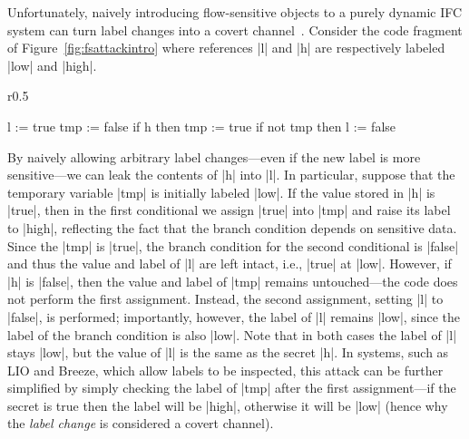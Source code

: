 Unfortunately, naively introducing flow-sensitive objects to a purely dynamic
IFC system can turn label changes into a covert channel~\cite{Russo:2010}. 
%
Consider the code fragment of Figure~\ref{fig:fsattackintro}
where references |l| and |h| are respectively labeled |low| and
|high|.
%
\begin{wrapfigure}{r}{0.5\columnwidth}
  \small
\begin{code}
l    := true
tmp  := false
if h then tmp := true
if not tmp then l := false
\end{code}
\vspace{-15pt}
\caption{\small\label{fig:fsattackintro} Flow-sensitive attack}
\end{wrapfigure}
%
By naively allowing arbitrary label changes---even if the new label is
more sensitive---we can leak the contents of |h| into |l|.
%
In particular, suppose that the temporary variable |tmp| is initially
labeled |low|.
%
If the value stored in |h| is |true|, then in the first conditional we
assign |true| into |tmp| and raise its label to |high|, reflecting the
fact that the branch condition depends on sensitive data.
%
Since the |tmp| is |true|, the branch condition for the second conditional is
|false| and thus the value and label of |l| are left intact, i.e., |true| at
|low|.
%
However, if |h| is |false|, then the value and label of |tmp| remains
untouched---the code does not perform the first assignment.
%
Instead, the second assignment, setting |l| to |false|, is performed;
importantly, however, the label of |l| remains |low|, since the label of the
branch condition is also |low|.
%
Note that in both cases the label of |l| stays |low|, but the value of |l| is
the same as the secret |h|.
%
In systems, such as LIO and Breeze, which allow labels to be inspected, this
attack can be further simplified by simply checking the label of |tmp| after
the first assignment---if the secret is true then the label will be |high|,
otherwise it will be |low| (hence why the \emph{label change} is considered a
covert channel).

